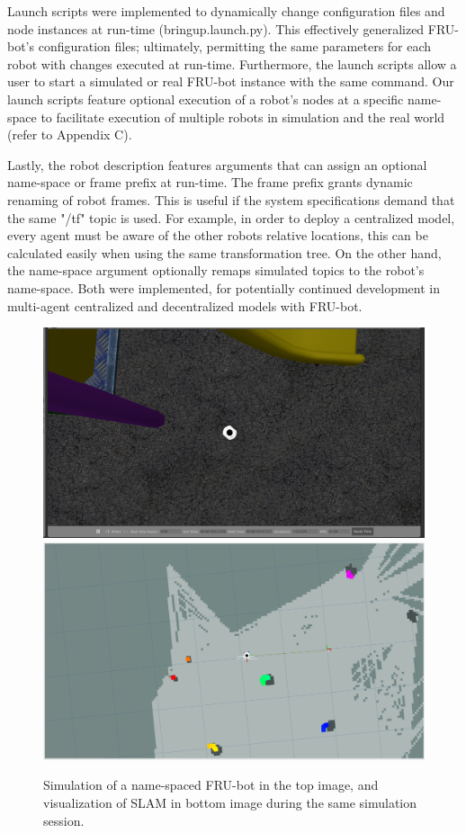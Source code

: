 \documentclass[conference]{IEEEtran}
\begin{document}
Launch scripts were implemented to dynamically change configuration files and node instances at run-time (bringup.launch.py). This effectively generalized FRU-bot's configuration files; ultimately, permitting the same parameters for each robot with changes executed at run-time. Furthermore, the launch scripts allow a user to start a simulated or real FRU-bot instance with the same command. Our launch scripts feature optional execution of a robot's nodes at a specific name-space to facilitate execution of multiple robots in simulation and the real world (refer to Appendix C).

Lastly, the robot description features arguments that can assign an optional name-space or frame prefix at run-time. The frame prefix grants dynamic renaming of robot frames. This is useful if the system specifications demand that the same "/tf" topic is used. For example, in order to deploy a centralized model, every agent must be aware of the other robots relative locations, this can be calculated easily when using the same transformation tree. On the other hand, the name-space argument optionally remaps simulated topics to the robot's name-space. Both were implemented, for potentially continued development in multi-agent centralized and decentralized models with FRU-bot.

\begin{figure}
	\includegraphics[width=\linewidth]{./figs/single_robot_slam_sim.png}
	\vspace{2mm}
	\includegraphics[width=\linewidth]{./figs/single_robot_slam.png}
	\caption{Simulation of a name-spaced FRU-bot in the top image, and visualization of SLAM in bottom image during the same simulation session.}
\end{figure}
\end{document}
